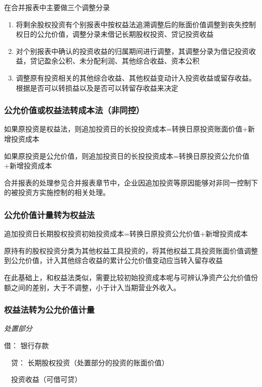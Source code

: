 \documentclass[UTF8,12pt]{ctexart}
\newenvironment{Dr}{\noindent 借：}{\par}
\newenvironment{Cr}{\noindent \ \ 贷：}{\par}
\numberwithin{equation}{section} %
\numberwithin{figure}{section}
\numberwithin{table}{section}
\begin{document}
	在合并报表中主要做三个调整分录
	\begin{enumerate}
		\item 将剩余股权投资有个别报表中按权益法追溯调整后的账面价值调整到丧失控制权日的公允价值，调整分录未借记长期股权投资、贷记投资收益
		
		\item 对个别报表中确认的投资收益的归属期间进行调整，其调整分录为借记投资收益，贷记盈余公积、未分配利润、其他综合收益、资本公积
		
		\item 调整原有投资相关的其他综合收益、其他权益变动计入投资收益或留存收益。根据是否可以转损益以及是否可以转留存收益来决定
	\end{enumerate}
	
	\subsubsection{公允价值或权益法转成本法（非同控）}
	如果原投资是权益法，则追加投资日的长投投资成本=转换日原投资账面价值+新增投资成本
	
	如果原投资是公允价值，则追加投资日的长投投资成本=转换日原投资公允价值+新增投资成本
	
	合并报表的处理参见合并报表章节中，企业因追加投资等原因能够对非同一控制下的被投资方实施控制的相关处理。
	
	\subsubsection{公允价值计量转为权益法}
	
	追加投资日长期股权投资初始投资成本=转换日原投资公允价值+新增投资成本
	
	原持有的股权投资分类为其他权益工具投资的，将其他权益工具投资账面价值调整到公允价值，计入其他综合收益的累计公允价值变动应当转入留存收益
	
	在此基础上，和权益法类似，需要比较初始投资成本呢与可辨认净资产公允价值份额之间的差别，大于不调整，小于计入当期营业外收入。
	
	\subsubsection{权益法转为公允价值计量}
	\textit{处置部分}
	
	\begin{Dr}
		银行存款
	\end{Dr}
	\begin{Cr}
		长期股权投资（处置部分的投资的账面价值）
		
		\ \ 投资收益（可借可贷）
	\end{Cr}
	
\end{document}
